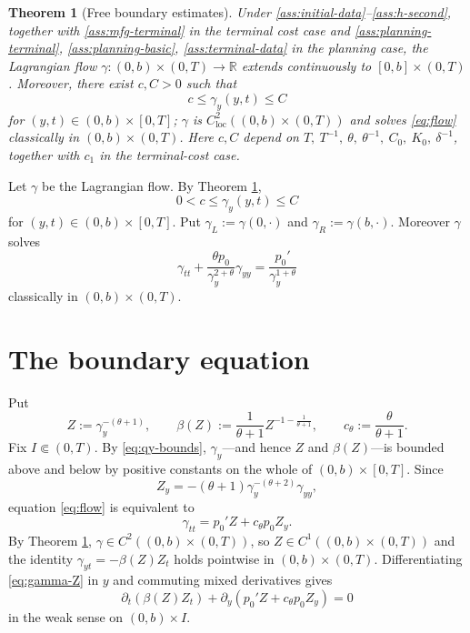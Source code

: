 \documentclass[11pt]{amsart}
\newtheorem{theorem}{Theorem}[section]
\newcommand{\R}{\mathbb R}
\newcommand{\loc}{\mathrm{loc}}
\begin{document}
\begin{theorem}[Free boundary estimates]
\label{thm:free-boundary-estimates}
Under \eqref{ass:initial-data}--\eqref{ass:h-second}, together with
\eqref{ass:mfg-terminal} in the terminal cost case and
\eqref{ass:planning-terminal}, \eqref{ass:planning-basic},
\eqref{ass:terminal-data} in the planning case, the
Lagrangian flow
\(\gamma:(0,b)\times(0,T)\to\R\) extends continuously to
\([0,b]\times(0,T)\). Moreover, there exist \(c,C>0\) such that
\[
        c\le \gamma_y(y,t)\le C
\]
for \((y,t)\in(0,b)\times[0,T]\);
\(\gamma\) is \(C^2_{\loc}((0,b)\times(0,T))\) and solves \eqref{eq:flow}
classically in \((0,b)\times(0,T)\).
Here \(c,C\) depend on \(T,\ T^{-1},\ \theta,\ \theta^{-1},\ C_0,\ K_0,\ \delta^{-1}\),
together with \(c_1\) in the terminal-cost case.
\end{theorem}

Let \(\gamma\) be the Lagrangian flow. By Theorem
\ref{thm:free-boundary-estimates},
\begin{equation}
\label{eq:qy-bounds}
        0<c\le \gamma_y(y,t)\le C
\end{equation}
for \((y,t)\in(0,b)\times[0,T]\). Put \(\gamma_L:=\gamma(0,\cdot)\) and
\(\gamma_R:=\gamma(b,\cdot)\). Moreover \(\gamma\) solves
\begin{equation}
\label{eq:flow}
        \gamma_{tt}
        +\frac{\theta p_0}{\gamma_y^{2+\theta}}\gamma_{yy}
        =
        \frac{p_0'}{\gamma_y^{1+\theta}}
\end{equation}
classically in \((0,b)\times(0,T)\).

\section{The boundary equation}
\label{sec:boundary-equation}

Put
\begin{equation}
\label{eq:Z-def}
        Z:=\gamma_y^{-(\theta+1)},\qquad
        \beta(Z):=\frac1{\theta+1}Z^{-1-\frac1{\theta+1}},\qquad
        c_\theta:=\frac{\theta}{\theta+1} .
\end{equation}
Fix \(I\Subset(0,T)\). By \eqref{eq:qy-bounds}, \(\gamma_y\)---and hence
\(Z\) and \(\beta(Z)\)---is bounded above and below by positive constants
on the whole of \((0,b)\times[0,T]\). Since
\[
        Z_y=-(\theta+1)\gamma_y^{-(\theta+2)}\gamma_{yy},
\]
equation \eqref{eq:flow} is equivalent to
\begin{equation}
\label{eq:gamma-Z}
      \gamma_{tt}=p_0'Z+c_\theta p_0Z_y.
\end{equation}
By Theorem \ref{thm:free-boundary-estimates},
\(\gamma\in C^2((0,b)\times(0,T))\), so \(Z\in C^1((0,b)\times(0,T))\) and
the identity \(\gamma_{yt}=-\beta(Z)Z_t\) holds pointwise in
\((0,b)\times(0,T)\). Differentiating \eqref{eq:gamma-Z} in \(y\) and
commuting mixed derivatives gives
\begin{equation}
\label{eq:Z-div}
        \partial_t\!\left(\beta(Z)Z_t\right)
        +\partial_y\!\left(p_0'Z+c_\theta p_0Z_y\right)=0
\end{equation}
in the weak sense on \((0,b)\times I\).
\end{document}

